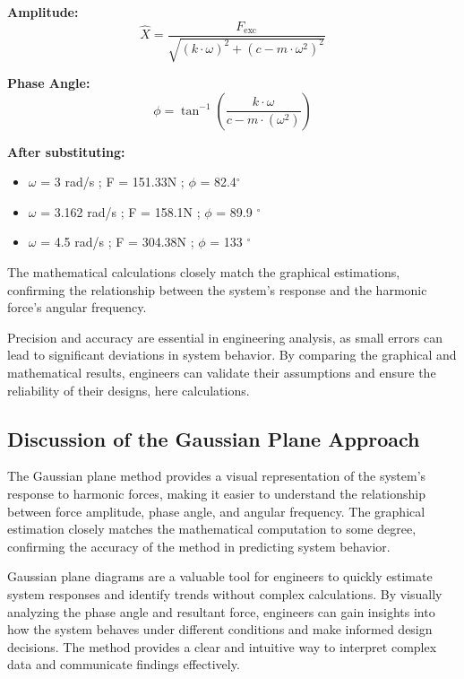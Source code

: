 \documentclass[12pt,a4paper]{article}
\begin{document}
\noindent\textbf{Amplitude:} 
\[
\hat{X} = \frac{F_{\text{exc}}}{\sqrt{(k \cdot \omega)^2 + (c - m \cdot \omega^2)^2}}
\]

\noindent\textbf{Phase Angle:}
\[
\phi = \tan^{-1} \left( \frac{k \cdot \omega}{c - m \cdot (\omega^2)} \right)
\]

\noindent\textbf{After substituting:}
\begin{itemize}
    \item \(\omega\) = 3 rad/s ; F = 151.33N ; \(\phi\) = 82.4\(^{\circ}\)
    \item \(\omega\) = 3.162 rad/s ; F = 158.1N ; \(\phi\) = 89.9 \(^{\circ}\)
    \item \(\omega\) = 4.5 rad/s ; F = 304.38N ; \(\phi\) = 133 \(^{\circ}\)
\end{itemize}
{\vspace{5pt}}
The mathematical calculations closely match the graphical estimations, confirming the relationship between the system's response and the harmonic force's angular frequency. 

Precision and accuracy are essential in engineering analysis, as small errors can lead to significant deviations in system behavior. By comparing the graphical and mathematical results, engineers can validate their assumptions and ensure the reliability of their designs, here calculations.
{\vspace{5pt}}
\subsection{Discussion of the Gaussian Plane Approach}

The Gaussian plane method provides a visual representation of the system's response to harmonic forces, making it easier to understand the relationship between force amplitude, phase angle, and angular frequency. The graphical estimation closely matches the mathematical computation to some degree, confirming the accuracy of the method in predicting system behavior.

{\vspace{5pt}}

Gaussian plane diagrams are a valuable tool for engineers to quickly estimate system responses and identify trends without complex calculations. By visually analyzing the phase angle and resultant force, engineers can gain insights into how the system behaves under different conditions and make informed design decisions. The method provides a clear and intuitive way to interpret complex data and communicate findings effectively.
\end{document}
